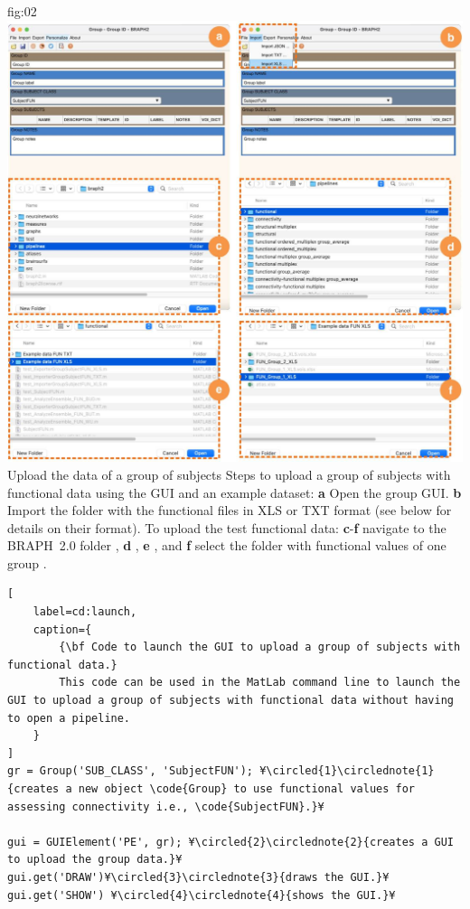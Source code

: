 \documentclass[justified]{tufte-handout}
\begin{document}
	{fig:02}
	{
	\includegraphics{fig02.jpg}
	}
	{Upload the data of a group of subjects}
	{
	Steps to upload a group of subjects with functional data using the GUI and an example dataset: 
	{\bf a} Open the group GUI.
	{\bf b} Import the folder with the functional files in XLS or TXT format (see below for details on their format).
	To upload the test functional data:
	{\bf c}-{\bf f} navigate to the BRAPH~2.0 folder , {\bf d} ,  {\bf e} , and {\bf f} select the folder with functional values of one group .
	}

%
\begin{lstlisting}[
	label=cd:launch,
	caption={
		{\bf Code to launch the GUI to upload a group of subjects with functional data.}
		This code can be used in the MatLab command line to launch the GUI to upload a group of subjects with functional data without having to open a pipeline.
	}
]
gr = Group('SUB_CLASS', 'SubjectFUN'); ¥\circled{1}\circlednote{1}{creates a new object \code{Group} to use functional values for assessing connectivity i.e., \code{SubjectFUN}.}¥

gui = GUIElement('PE', gr); ¥\circled{2}\circlednote{2}{creates a GUI to upload the group data.}¥
gui.get('DRAW')¥\circled{3}\circlednote{3}{draws the GUI.}¥
gui.get('SHOW') ¥\circled{4}\circlednote{4}{shows the GUI.}¥
\end{lstlisting}
\end{document}

